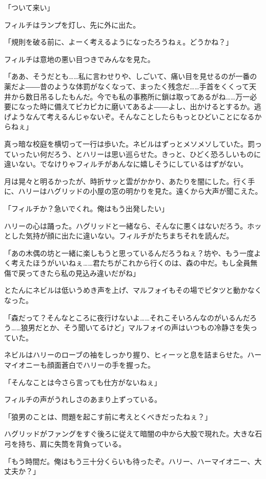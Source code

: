 \documentclass[10pt,a4paper]{article}
\begin{document}
\begin{CJK}{UTF8}{min}
「ついて来い」

フィルチはランプを灯し、先に外に出た。

「規則を破る前に、よーく考えるようになったろうねぇ。どうかね？」

フィルチは意地の悪い目つきでみんなを見た。

「ああ、そうだとも……私に言わせりや、しごいて、痛い目を見せるのが一番の薬だよ――昔のような体罰がなくなって、まったく残念だ……手首をくくって天井から数日吊るしたもんだ。今でも私の事務所に鎖は取ってあるがね……万一必要になった時に備えてピカピカに磨いてあるよ――よし、出かけるとするか。逃げようなんて考えるんじゃないぞ。そんなことしたらもっとひどいことになるからねぇ」

真っ暗な校庭を横切って一行は歩いた。ネビルはずっとメソメソしていた。罰っていったい何だろう、とハリーは思い巡らせた。きっと、ひどく恐ろしいものに違いない。でなけりゃフィルチがあんなに嬉しそうにしているはずがない。

月は晃々と明るかったが、時折サッと雲がかかり、あたりを闇にした。行く手に、ハリーはハグリッドの小屋の窓の明かりを見た。遠くから大声が聞こえた。

「フィルチか？急いでくれ。俺はもう出発したい」

ハリーの心は踊った。ハグリッドと一緒なら、そんなに悪くはないだろう。ホッとした気持が顔に出たに違いない。フィルチがたちまちそれを読んだ。

「あの木偶の坊と一緒に楽しもうと思っているんだろうねぇ？坊や、もう一度よく考えたほうがいいねぇ……君たちがこれから行くのは、森の中だ。もし全員無傷で戻ってきたら私の見込み違いだがね」

とたんにネビルは低いうめき声を上げ、マルフォイもその場でピタツと動かなくなった。

「森だって？そんなところに夜行けないよ……それこそいろんなのがいるんだろう……狼男だとか、そう聞いてるけど」マルフォイの声はいつもの冷静さを失っていた。

ネビルはハリーのローブの袖をしっかり握り、ヒィーッと息を詰まらせた。ハーマイオニーも顔面蒼白でハリーの手を握った。

「そんなことは今さら言っても仕方がないねぇ」

フィルチの声がうれしさのあまり上ずっている。

「狼男のことは、問題を起こす前に考えとくべきだったねぇ？」

ハグリッドがファングをすぐ後ろに従えて暗闇の中から大股で現れた。大きな石弓を持ち、肩に失筒を背負っている。

「もう時間だ。俺はもう三十分くらいも待ったぞ。ハリー、ハーマイオニー、大丈夫か？」


\end{CJK}
\end{document}
